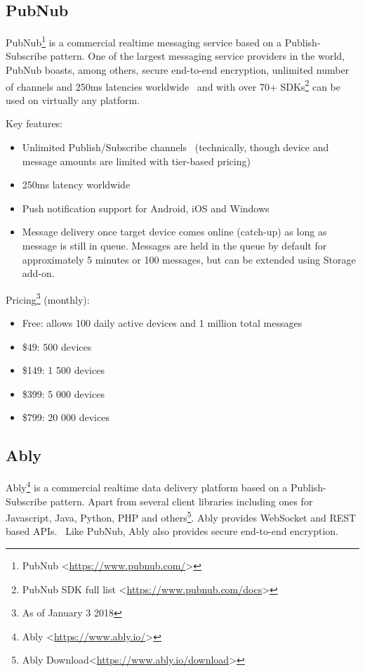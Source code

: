 \subsection{PubNub}
PubNub\footnote{PubNub <\url{https://www.pubnub.com/}>} is a commercial realtime messaging service based on a Publish-Subscribe pattern. One of the largest messaging service providers in the world, PubNub boasts, among others, secure end-to-end encryption, unlimited number of channels and 250ms latencies worldwide~\protect\cite{pubnub-messaging} and with over 70+ SDKs\footnote{PubNub SDK full list <\url{https://www.pubnub.com/docs}>} can be used on virtually any platform.

Key features:
\begin{itemize}
\item Unlimited Publish/Subscribe channels~\protect\cite{pubnub-messaging} (technically, though device and message amounts are limited with tier-based pricing)
\item 250ms latency worldwide~\protect\cite{pubnub-messaging}
\item Push notification support for Android, iOS and Windows
\item Message delivery once target device comes online (catch-up) as long as message is still in queue. Messages are held in the queue by default for approximately 5 minutes or 100 messages, but can be extended using Storage add-on.~\protect\cite{pubnub-catchup}
\end{itemize}

Pricing\footnote{As of January 3 2018} (monthly):
\begin{itemize}
\item Free: allows 100 daily active devices and 1 million total messages
\item \$49: 500 devices
\item \$149: 1 500 devices
\item \$399: 5 000 devices
\item \$799: 20 000 devices
\end{itemize}

\subsection{Ably}
Ably\footnote{Ably <\url{https://www.ably.io/}>} is a commercial realtime data delivery platform based on a Publish-Subscribe pattern. Apart from several client libraries including ones for Javascript, Java, Python, PHP and others\footnote{Ably Download<\url{https://www.ably.io/download}>}. Ably provides WebSocket and REST based APIs.~\protect\cite{ably-docs} Like PubNub, Ably also provides secure end-to-end encryption.

